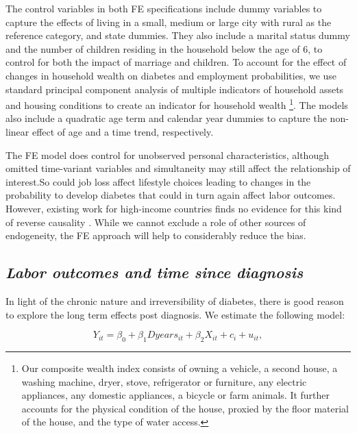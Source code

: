 \documentclass[12pt,english]{article}
\begin{document}
The control variables in both \ac{FE} specifications include dummy variables to capture the effects of living in a small, medium or large city with rural as the reference category, and state dummies. They also include a marital status dummy and the number of children residing in the household below the age of 6, to control for both the impact of marriage and children. To account for the effect of changes in household wealth on diabetes and employment probabilities, we use standard principal component analysis of multiple indicators of household assets and housing conditions to create an indicator for household wealth \parencite{Filmer2001}\footnote{Our composite wealth index consists of owning a vehicle, a second house, a washing machine, dryer, stove, refrigerator or furniture, any electric appliances, any domestic appliances, a bicycle or farm animals. It further accounts for the physical condition of the house, proxied by the floor material of the house, and the type of water access.}. The models also include a quadratic age term and calendar year dummies to capture the non-linear effect of age and a time trend, respectively.

The FE model does control for unobserved personal characteristics, although omitted time-variant variables and simultaneity may still affect the relationship of interest.So could job loss affect lifestyle choices leading to changes in the probability to develop diabetes that could in turn again affect labor outcomes. However, existing work for high-income countries finds no evidence for this kind of reverse causality \parencite{Bergemann2011,Schaller2015}. While we cannot exclude a role of other sources of endogeneity, the \ac{FE} approach will help to considerably reduce the bias.


\subsection{\textit{Labor outcomes and time since diagnosis}}

In light of the chronic nature and irreversibility of diabetes, there is good reason to explore the long term effects post diagnosis.  We estimate the following model:

\begin{equation}
Y_{it}=\beta_{0}+\beta_{1}Dyears_{it}+\beta_{2}X_{it}+c_{i}+u_{it},\label{eq:duration_linear}
\end{equation}
\end{document}
